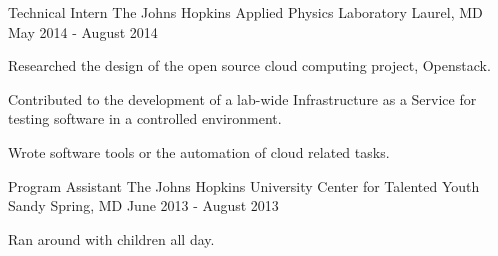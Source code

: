 \begin{cventries}
\cventry
{Technical Intern}
{The Johns Hopkins Applied Physics Laboratory}
{Laurel, MD}
{May 2014 - August 2014}
{
    \begin{cvitems}
        \item{Researched the design of the open source cloud computing project, Openstack.}
        \item{Contributed to the development of a lab-wide Infrastructure as a Service for testing software in a controlled environment.}
        \item{Wrote software tools or the automation of cloud related tasks.}
    \end{cvitems}
}

\cventry
{Program Assistant}
{The Johns Hopkins University Center for Talented Youth}
{Sandy Spring, MD}
{June 2013 - August 2013}
{
    \begin{cvitems}
        \item{Ran around with children all day.}
    \end{cvitems}
}


\end{cventries}
